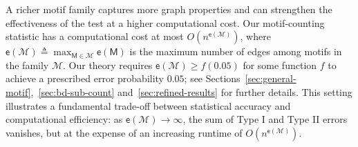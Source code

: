 \documentclass[letterpaper,11pt]{article}
\theoremstyle{definition}
\newcommand{\maM}{\mathcal{M}}
\newcommand{\maT}{\mathcal{T}}
\newcommand{\nbr}[1]{{\sf\color{red}[#1]}}
\newcommand{\en}{\mathsf{{e}}}
\newcommand{\sfM}{{\mathsf{M}}}
\begin{document}


A richer motif family captures more graph properties and can strengthen the effectiveness of the test at a higher computational cost. 
Our motif-counting statistic has a computational cost at most $O(n^{\en(\maM)})$, where $\en(\maM)\triangleq\max_{\sfM\in \maM}\en(\sfM)$ is the maximum number of edges among motifs in the family $\maM$.
Our theory requires $\en(\maM)\ge f(0.05)$ for some function $f$ to achieve a prescribed error probability $0.05$; see Sections~\ref{sec:general-motif},~\ref{sec:bd-sub-count} and~\ref{sec:refined-results} for further details. This setting illustrates a fundamental trade-off between statistical accuracy and computational efficiency: as $\en(\maM)\to\infty$, the sum of Type I and Type II errors vanishes, but at the expense of an increasing runtime of $O(n^{\en(\maM)})$.
\end{document}
